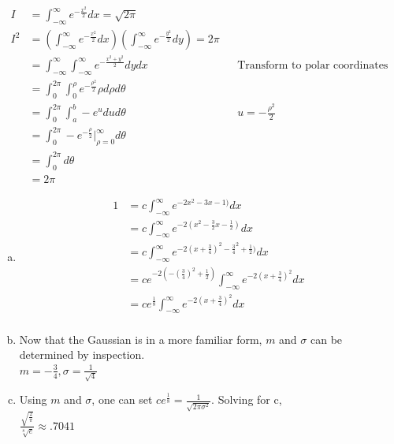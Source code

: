 \documentclass[12pt]{article}
\newenvironment{problem}[2][Problem]{\begin{trivlist}
\item[\hskip \labelsep {\bfseries #1}\hskip \labelsep {\bfseries #2.}]
  \vspace{1 cm}
}{\end{trivlist}}
\begin{document}
\begin{problem}{3.19}
\item %
  \begin{align*}
    I &= \int_{-\infty}^{\infty} e^{-\frac{x^2}{2}}dx = \sqrt{2\pi} \\
    I^2 &= \left(\int_{-\infty}^{\infty} e^{-\frac{x^2}{2}}dx \right)
    \left( \int_{-\infty}^{\infty} e^{-\frac{y^2}{2}}dy \right) = 2\pi \\
    &= \int_{-\infty}^{\infty} \int_{-\infty}^{\infty} e^{-\frac{x^2+y^2}{2}}dydx
    & & \textrm{Transform to polar coordinates} \\
    &= \int_{0}^{2\pi} \int_{0}^{\rho} e^{-\frac{\rho^2}{2}}\rho d\rho d\theta \\
    &= \int_{0}^{2\pi} \int_{a}^{b} -e^{u}du d\theta & & u = -\frac{\rho^2}{2} \\
    &= \int_{0}^{2\pi} -e^{-\frac{\rho}{2}} \big|_{\rho = 0}^{\infty} d\theta \\
    &= \int_{0}^{2\pi} d\theta \\
    &= 2\pi
  \end{align*}
\end{problem}

\begin{problem}{3.21}
\item
  \begin{enumerate}[a.]
    \item %
      \begin{align*}
        1 &= c \int_{-\infty}^{\infty} e^{-2x^2 -3x-1)}dx \\
        &= c \int_{-\infty}^{\infty} e^{-2(x^2 -\frac{3}{2}x-\frac{1}{2})}dx \\
        &= c \int_{-\infty}^{\infty} e^{-2(x +\frac{3}{4})^2-\frac{3}{4}^2+\frac{1}{2})}dx \\
        &= ce^{-2\left(-(\frac{3}{4})^2+\frac{1}{2}\right)} \int_{-\infty}^{\infty} e^{-2(x +\frac{3}{4})^2}dx \\
        &= ce^{\frac{1}{8}} \int_{-\infty}^{\infty} e^{-2(x +\frac{3}{4})^2}dx \\
      \end{align*}
    \item %
      Now that the Gaussian is in a more familiar form, $m$ and $\sigma$ can be
      determined by inspection. \\
      $m = -\frac{3}{4}, \sigma = \frac{1}{\sqrt{4}}$
    \item %
      Using $m$ and $\sigma$, one can set $ce^{\frac{1}{8}}= \frac{1}{\sqrt{2\pi\sigma^2}}$.
      Solving for c,\\
      $\frac{\sqrt{\frac{2}{\pi}}}{\sqrt[8]{e}} \approx .7041$
  \end{enumerate}
\end{problem}
\end{document}
